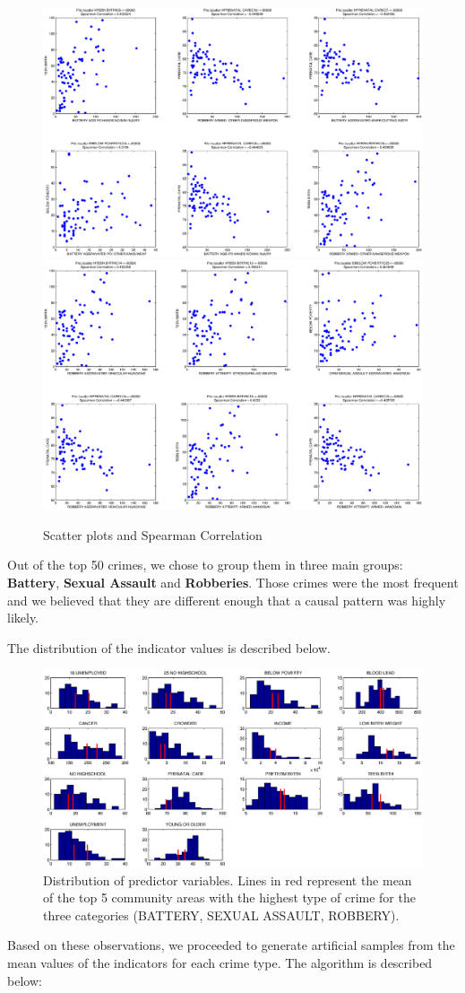 \documentclass[a4paper,10pt]{article}
\begin{document}
\begin{figure}[H]
\includegraphics[width=0.3\linewidth]{media/ScatterPlot8.eps}\hspace{1cm}
\includegraphics[width=0.3\linewidth]{media/ScatterPlot9.eps}
\caption{Scatter plots and Spearman Correlation}
\end{figure}

Out of the top 50 crimes, we chose to group them in three main groups: \textbf{Battery}, \textbf{Sexual Assault} and \textbf{Robberies}. Those crimes were the most frequent and we believed that they are different enough that a causal pattern was highly likely.

The distribution of the indicator values is described below.

\begin{figure}[ht]
	\includegraphics[width=\linewidth]{media/distribution.eps}
	\caption{Distribution of predictor variables. Lines in red represent the mean of the top 5 community areas with the highest type of crime for the three categories (BATTERY, SEXUAL ASSAULT, ROBBERY).}
\end{figure}

Based on these observations, we proceeded to generate artificial samples from the mean values of the indicators for each crime type. The algorithm is described below:
\end{document}
